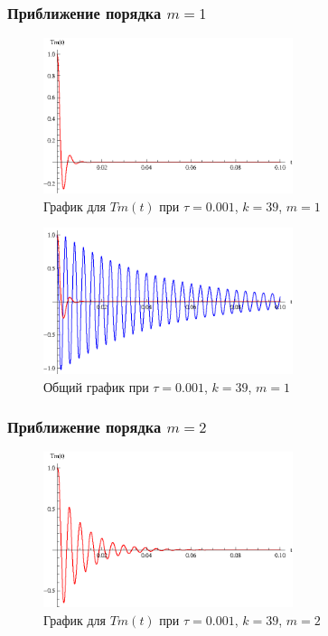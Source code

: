 \vfill

\newpage

\subsubsection{Приближение порядка $m=1$}

\begin{figure}[h]
\begin{center}
\includegraphics[width=0.65\textwidth]{./3_results/3_2.eps}
\end{center}
\caption{График для $Tm(t)$ при $\tau=0.001$, $k=39$, $m=1$}
\end{figure}

\begin{figure}[h]
\begin{center}
\includegraphics[width=0.65\textwidth]{./3_results/3_3.eps}
\end{center}
\caption{Общий график при $\tau=0.001$, $k=39$, $m=1$}
\end{figure}

\newpage

\subsubsection{Приближение порядка $m=2$}

\begin{figure}[h]
\begin{center}
\includegraphics[width=0.65\textwidth]{./3_results/3_4.eps}
\end{center}
\caption{График для $Tm(t)$ при $\tau=0.001$, $k=39$, $m=2$}
\end{figure}

